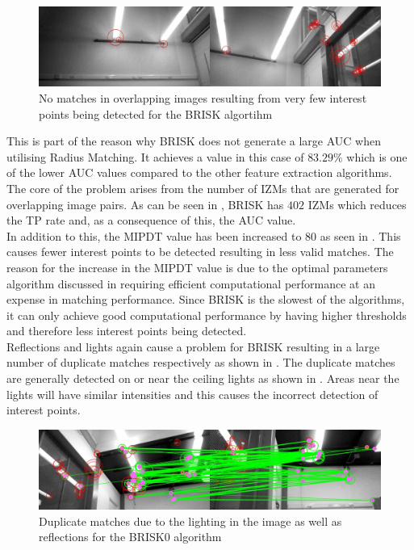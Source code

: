 \documentclass[11pt]{report}
\begin{document}
\begin{figure}
  \centering
    \includegraphics[width=1.0\textwidth]{../Drawings/Matching/noMatchesBrisk4.jpg}
    \caption{No matches in overlapping images resulting from very few interest points being detected for the BRISK algortihm }
    \label{fig:noMatchesBrisk4}
\end{figure}

This is part of the reason why BRISK does not generate a large AUC when utilising Radius Matching. It achieves a  value in this case of $83.29\%$ which is one of the lower AUC values compared to the other feature extraction algorithms. The core of the problem arises from the number of IZMs that are generated for overlapping image pairs. As can be seen in , BRISK has $402$ IZMs which reduces the TP rate and, as a consequence of this, the AUC value.\\

In addition to this, the MIPDT value has been increased to $80$ as seen in . This causes fewer interest points to be detected resulting in less valid matches. The reason for the increase in the MIPDT value is due to the optimal parameters algorithm discussed in  requiring efficient computational performance at an expense in matching performance. Since BRISK is the slowest of the algorithms, it can only achieve good computational performance by having higher thresholds and therefore less interest points being detected.\\

Reflections and lights again cause a problem for BRISK resulting in a large number of duplicate matches respectively as shown in . The duplicate matches are generally detected on or near the ceiling lights as shown in . Areas near the lights will have similar intensities and this causes the incorrect detection of interest points.\\

\begin{figure}
  \centering
    \includegraphics[width=1.0\textwidth]{../Drawings/problems/Reflections.jpg}
    \caption{Duplicate matches due to the lighting in the image as well as reflections for the BRISK0 algorithm} 
    \label{fig:duplicateMatchesBrisk}
\end{figure}
\end{document}

